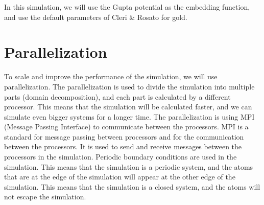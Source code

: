     In this simulation, we will use the Gupta potential \cite{gupta1981lattice} as the embedding function, and use the default parameters of Cleri \& Rosato \cite{cleri1993tight} for gold.


\section{Parallelization}
    To scale and improve the performance of the simulation, we will use parallelization. The parallelization is used to divide the simulation into multiple parts (domain decomposition), and each part is calculated by a different processor. This means that the simulation will be calculated faster, and we can simulate even bigger systems for a longer time.  
    The parallelization is using MPI (Message Passing Interface) to communicate between the processors. MPI is a standard for message passing between processors and for the communication between the processors. It is used to send and receive messages between the processors in the simulation.
    Periodic boundary conditions are used in the simulation. This means that the simulation is a periodic system, and the atoms that are at the edge of the simulation will appear at the other edge of the simulation. This means that the simulation is a closed system, and the atoms will not escape the simulation.